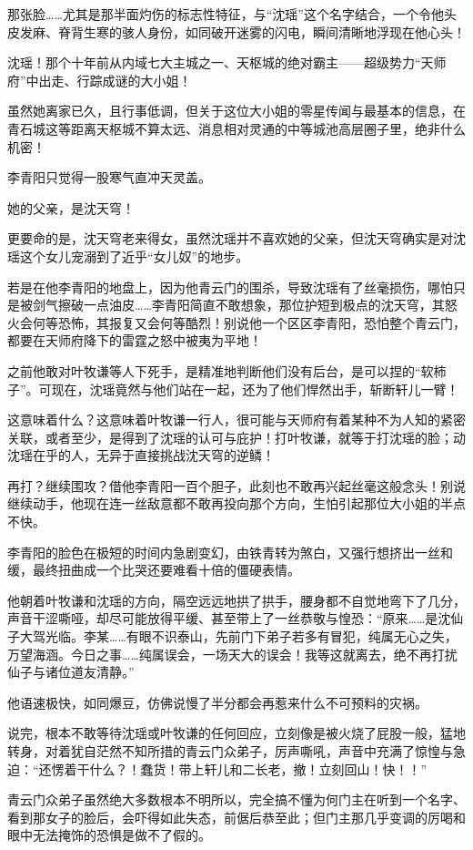 那张脸……尤其是那半面灼伤的标志性特征，与“沈瑶”这个名字结合，一个令他头皮发麻、脊背生寒的骇人身份，如同破开迷雾的闪电，瞬间清晰地浮现在他心头！

沈瑶！那个十年前从内域七大主城之一、天枢城的绝对霸主——超级势力“天师府”中出走、行踪成谜的大小姐！

虽然她离家已久，且行事低调，但关于这位大小姐的零星传闻与最基本的信息，在青石城这等距离天枢城不算太远、消息相对灵通的中等城池高层圈子里，绝非什么机密！

李青阳只觉得一股寒气直冲天灵盖。

她的父亲，是沈天穹！

更要命的是，沈天穹老来得女，虽然沈瑶并不喜欢她的父亲，但沈天穹确实是对沈瑶这个女儿宠溺到了近乎“女儿奴”的地步。

若是在他李青阳的地盘上，因为他青云门的围杀，导致沈瑶有了丝毫损伤，哪怕只是被剑气擦破一点油皮……李青阳简直不敢想象，那位护短到极点的沈天穹，其怒火会何等恐怖，其报复又会何等酷烈！别说他一个区区李青阳，恐怕整个青云门，都要在天师府降下的雷霆之怒中被夷为平地！

之前他敢对叶牧谦等人下死手，是精准地判断他们没有后台，是可以捏的“软柿子”。可现在，沈瑶竟然与他们站在一起，还为了他们悍然出手，斩断轩儿一臂！

这意味着什么？这意味着叶牧谦一行人，很可能与天师府有着某种不为人知的紧密关联，或者至少，是得到了沈瑶的认可与庇护！打叶牧谦，就等于打沈瑶的脸；动沈瑶在乎的人，无异于直接挑战沈天穹的逆鳞！

再打？继续围攻？借他李青阳一百个胆子，此刻也不敢再兴起丝毫这般念头！别说继续动手，他现在连一丝敌意都不敢再投向那个方向，生怕引起那位大小姐的半点不快。

李青阳的脸色在极短的时间内急剧变幻，由铁青转为煞白，又强行想挤出一丝和缓，最终扭曲成一个比哭还要难看十倍的僵硬表情。

他朝着叶牧谦和沈瑶的方向，隔空远远地拱了拱手，腰身都不自觉地弯下了几分，声音干涩嘶哑，却尽可能放得平缓、甚至带上了一丝恭敬与惶恐：“原来……是沈仙子大驾光临。李某……有眼不识泰山，先前门下弟子若多有冒犯，纯属无心之失，万望海涵。今日之事……纯属误会，一场天大的误会！我等这就离去，绝不再打扰仙子与诸位道友清静。”

他语速极快，如同爆豆，仿佛说慢了半分都会再惹来什么不可预料的灾祸。

说完，根本不敢等待沈瑶或叶牧谦的任何回应，立刻像是被火烧了屁股一般，猛地转身，对着犹自茫然不知所措的青云门众弟子，厉声嘶吼，声音中充满了惊惶与急迫：“还愣着干什么？！蠢货！带上轩儿和二长老，撤！立刻回山！快！！”

青云门众弟子虽然绝大多数根本不明所以，完全搞不懂为何门主在听到一个名字、看到那女子的脸后，会吓得如此失态，前倨后恭至此；但门主那几乎变调的厉喝和眼中无法掩饰的恐惧是做不了假的。

